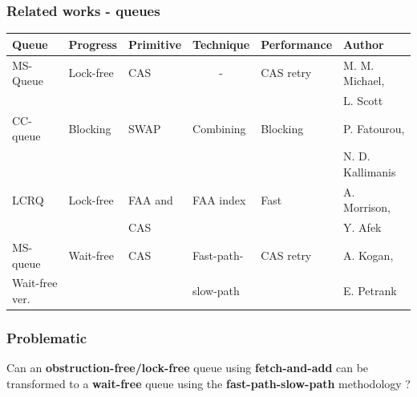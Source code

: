 \documentclass[10pt,a4paper]{beamer}
\begin{document}
\begin{frame}
  \frametitle{Related works - queues}
  \small
  \begin{tabular}{|l|l|l|l|l|l|}\hline
    Queue & Progress & Primitive & Technique & Performance & Author \\\hline
    MS-Queue & Lock-free & CAS & \multicolumn{1}{|c|}{-} & CAS retry & M. M. Michael, \\
    & & & & & L. Scott \\\hline
    CC-queue & Blocking & SWAP & Combining & Blocking & P. Fatourou, \\
    & & & & & N. D. Kallimanis \\\hline
    LCRQ & Lock-free & FAA and & FAA index & Fast & A. Morrison, \\
    & & CAS & & & Y. Afek \\\hline
    MS-queue & Wait-free & CAS & Fast-path- & CAS retry & A. Kogan,\\
    Wait-free ver. & & & slow-path & & E. Petrank \\\hline
  \end{tabular}
\end{frame}

\begin{frame}
  \frametitle{Problematic}
  \large Can an \textbf{obstruction-free/lock-free} queue using
  \textbf{fetch-and-add} can be transformed to a \textbf{wait-free} queue using
  the \textbf{fast-path-slow-path} methodology ?
\end{frame}
\end{document}
